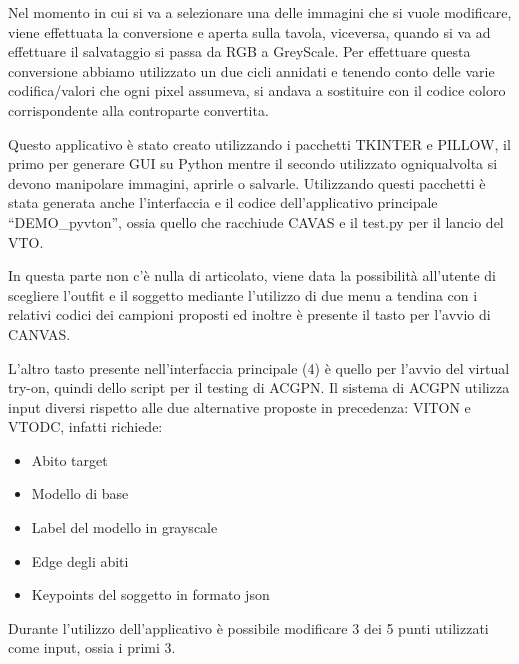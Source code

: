 \documentclass[final, 11pt]{article}
\begin{document}
	Nel momento in cui si va a selezionare una delle immagini che si vuole modificare, viene effettuata la conversione e aperta sulla tavola, viceversa, quando si va ad effettuare il salvataggio si passa da RGB a GreyScale. Per effettuare questa conversione abbiamo utilizzato un due cicli annidati e tenendo conto delle varie codifica/valori che ogni pixel assumeva, si andava a sostituire con il codice coloro corrispondente alla controparte convertita.
	
	Questo applicativo è stato creato utilizzando i pacchetti TKINTER e PILLOW, il primo per generare GUI su Python mentre il secondo utilizzato ogniqualvolta si devono manipolare immagini, aprirle o salvarle.
	Utilizzando questi pacchetti è stata generata anche l’interfaccia e il codice dell’applicativo principale “DEMO\_pyvton”, ossia quello che racchiude CAVAS e il test.py per il lancio del VTO.
	
	In questa parte non c’è nulla di articolato, viene data la possibilità all’utente di scegliere l’outfit e il soggetto mediante l’utilizzo di due menu a tendina con i relativi codici dei campioni proposti ed inoltre è presente il tasto per l’avvio di CANVAS.
	
	L’altro tasto presente nell’interfaccia principale (4) è quello per l’avvio del virtual try-on, quindi dello script per il testing di ACGPN.
	Il sistema di ACGPN utilizza input diversi rispetto alle due alternative proposte in precedenza: VITON e VTODC, infatti richiede:
	\begin{itemize}
		\item Abito target
		\item Modello di base
		\item Label del modello in grayscale
		\item Edge degli abiti
		\item Keypoints del soggetto in formato json
	\end{itemize}
	Durante l’utilizzo dell’applicativo è possibile modificare 3 dei 5 punti utilizzati come input, ossia i primi 3.
	
\end{document}
